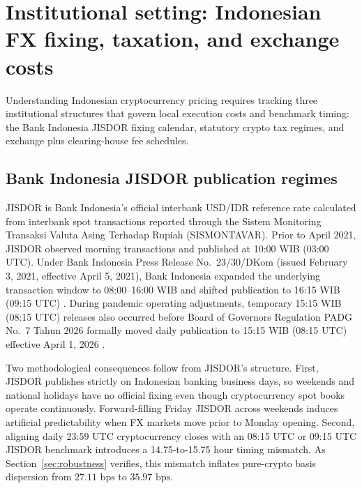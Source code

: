 \section{Institutional setting: Indonesian FX fixing, taxation, and exchange costs}
\label{sec:institutional}

Understanding Indonesian cryptocurrency pricing requires tracking three institutional structures that govern local execution costs and benchmark timing: the Bank Indonesia JISDOR fixing calendar, statutory crypto tax regimes, and exchange plus clearing-house fee schedules.

\subsection{Bank Indonesia JISDOR publication regimes}
JISDOR is Bank Indonesia's official interbank USD/IDR reference rate calculated from interbank spot transactions reported through the Sistem Monitoring Transaksi Valuta Asing Terhadap Rupiah (SISMONTAVAR). Prior to April 2021, JISDOR observed morning transactions and published at 10:00 WIB (03:00 UTC). Under Bank Indonesia Press Release No.\ 23/30/DKom (issued February 3, 2021, effective April 5, 2021), Bank Indonesia expanded the underlying transaction window to 08:00--16:00 WIB and shifted publication to 16:15 WIB (09:15 UTC) \citep{bi_sp233021}. During pandemic operating adjustments, temporary 15:15 WIB (08:15 UTC) releases also occurred before Board of Governors Regulation PADG No.\ 7 Tahun 2026 formally moved daily publication to 15:15 WIB (08:15 UTC) effective April 1, 2026 \citep{bi_padg072026}.

Two methodological consequences follow from JISDOR's structure. First, JISDOR publishes strictly on Indonesian banking business days, so weekends and national holidays have no official fixing even though cryptocurrency spot books operate continuously. Forward-filling Friday JISDOR across weekends induces artificial predictability when FX markets move prior to Monday opening. Second, aligning daily 23:59 UTC cryptocurrency closes with an 08:15 UTC or 09:15 UTC JISDOR benchmark introduces a 14.75-to-15.75 hour timing mismatch. As Section~\ref{sec:robustness} verifies, this mismatch inflates pure-crypto basis dispersion from $27.11\text{ bps}$ to $35.97\text{ bps}$.

